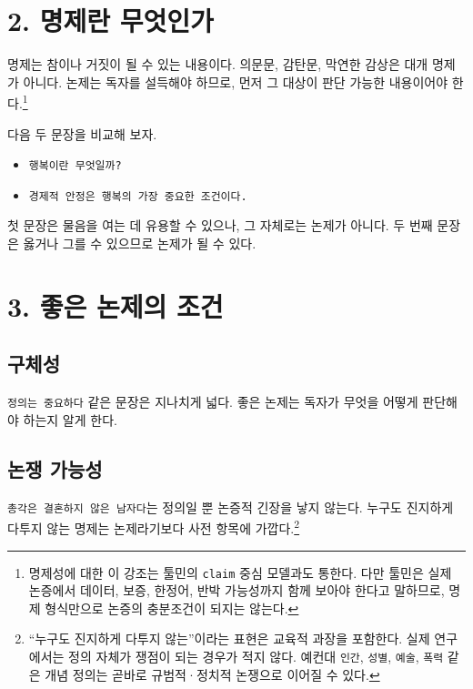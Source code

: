 \section{2. 명제란 무엇인가}\label{2-uxba85uxc81cuxb780-uxbb34uxc5c7uxc778uxac00}

명제는 참이나 거짓이 될 수 있는 내용이다. 의문문, 감탄문, 막연한 감상은 대개 명제가 아니다. 논제는 독자를 설득해야 하므로, 먼저 그 대상이 판단 가능한 내용이어야 한다.\footnote{명제성에 대한 이 강조는 툴민의 \texttt{claim} 중심 모델과도 통한다. 다만 툴민은 실제 논증에서 데이터, 보증, 한정어, 반박 가능성까지 함께 보아야 한다고 말하므로, 명제 형식만으로 논증의 충분조건이 되지는 않는다.}

다음 두 문장을 비교해 보자.

\begin{itemize}
\tightlist
\item
  \texttt{행복이란\ 무엇일까?}
\item
  \texttt{경제적\ 안정은\ 행복의\ 가장\ 중요한\ 조건이다.}
\end{itemize}

첫 문장은 물음을 여는 데 유용할 수 있으나, 그 자체로는 논제가 아니다. 두 번째 문장은 옳거나 그를 수 있으므로 논제가 될 수 있다.

\section{3. 좋은 논제의 조건}\label{3-uxc88buxc740-uxb17cuxc81cuxc758-uxc870uxac74}

\subsection{구체성}\label{uxad6cuxccb4uxc131}

\texttt{정의는\ 중요하다} 같은 문장은 지나치게 넓다. 좋은 논제는 독자가 무엇을 어떻게 판단해야 하는지 알게 한다.

\subsection{논쟁 가능성}\label{uxb17cuxc7c1-uxac00uxb2a5uxc131}

\texttt{총각은\ 결혼하지\ 않은\ 남자다}는 정의일 뿐 논증적 긴장을 낳지 않는다. 누구도 진지하게 다투지 않는 명제는 논제라기보다 사전 항목에 가깝다.\footnote{``누구도 진지하게 다투지 않는''이라는 표현은 교육적 과장을 포함한다. 실제 연구에서는 정의 자체가 쟁점이 되는 경우가 적지 않다. 예컨대 \texttt{인간}, \texttt{성별}, \texttt{예술}, \texttt{폭력} 같은 개념 정의는 곧바로 규범적·정치적 논쟁으로 이어질 수 있다.}

